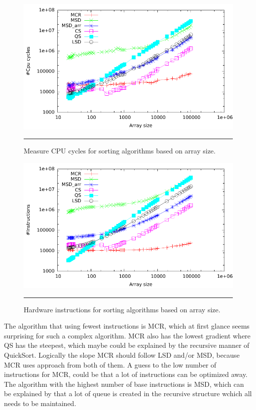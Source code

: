 \begin{figure}[htbp]
	\centering
		\includegraphics[width=\textwidth]{./Figures/Project2b/Cpu_cycles.pdf}
		\rule{35em}{0.5pt}
	\caption[CPU cycles]{
	Measure CPU cycles for sorting algorithms based on array size.
	}
	\label{fig:Cpu_cycles_p2b}
\end{figure}


\begin{figure}[htbp]
	\centering
		\includegraphics[width=\textwidth]{./Figures/Project2b/Instructions.pdf}
		\rule{35em}{0.5pt}
	\caption[Instructions]{
	Hardware instructions for sorting algorithms based on array size.
	}
	\label{fig:Instructions_p2b}
\end{figure}
The algorithm that using fewest instructions is MCR, which at first glance seems surprising for such a complex algorithm.
MCR also has the lowest gradient where QS has the steepest, which maybe could be explained by the recursive manner of QuickSort.
Logically the slope MCR should follow LSD and/or MSD, because MCR uses approach from both of them.
A guess to the low number of instructions for MCR, could be that a lot of instructions can be optimized away.
The algorithm with the highest number of base instructions is MSD, which can be explained by that a lot of queue is created in the recursive structure wchich all needs to be maintained. 

